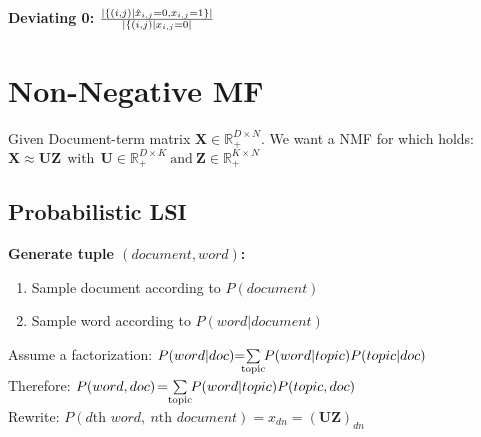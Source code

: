 \documentclass[a4paper,11pt]{article}
\newcommand{\R}{\mathbb{R}}
\newcommand{\msection}[1]{\section{#1}\vspace{-0.5mm}}
\begin{document}
\begin{multicols}{2}
\begin{minipage}{0.5\columnwidth}
  \textbf{Deviating 0:} ${|\{(i,j)|\hat x_{i,j} = 0, x_{i,j} = 1\}| \over |\{(i,j)|x_{i,j}=0|}$\\
\end{minipage}


\msection{Non-Negative MF}
Given Document-term matrix $\mathbf X\in \R_+^{D\times N}$. We want a NMF for which holds:\\
\vspace{-0.1cm}\hspace{2.5cm}
$\mathbf X \approx \mathbf{UZ} \ \ \text{with}\ \  \mathbf U\in \R_+^{D \times K}\ \text{and}\ \mathbf Z\in \R_+^{K\times N}$
\subsection{Probabilistic LSI}
\textbf{Generate tuple $(document, word)$:}
\begin{enumerate}[leftmargin=0.5cm]
  \itemsep0em 
  \item Sample document according to $P(document)$
  \item Sample word according to $P(word|document)$
\end{enumerate}
Assume a factorization: \hspace{-0.2cm}
$P(word|doc) \hspace{-0.1cm} = \hspace{-0.2cm} \sum\limits_{\text{topic}} \hspace{-0.1cm} P(word|topic)P(topic|doc)$\\
Therefore: \hspace{1.6cm}$P(word, doc) \hspace{-0.05cm} = \hspace{-0.1cm} \sum\limits_{\text{topic}} \hspace{-0.1cm}  P(word|topic)P(topic, doc)$\\
Rewrite: \hspace{1.8cm}$P(d\text{th } word,\ n\text{th } document) = x_{dn} = (\mathbf{UZ})_{dn}$\\
  

\end{multicols}
\end{document}
